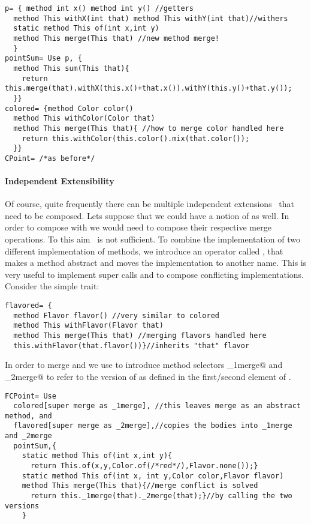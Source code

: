 \saveSpace\saveSpace \begin{lstlisting}
p= { method int x() method int y() //getters
  method This withX(int that) method This withY(int that)//withers
  static method This of(int x,int y)
  method This merge(This that) //new method merge!
  }
pointSum= Use p, { 
  method This sum(This that){
    return this.merge(that).withX(this.x()+that.x()).withY(this.y()+that.y());
  }}
colored= {method Color color()
  method This withColor(Color that)
  method This merge(This that){ //how to merge color handled here
    return this.withColor(this.color().mix(that.color());
  }}
CPoint= /*as before*/
\end{lstlisting} \saveSpace\saveSpace 

\paragraph{Independent Extensibility}
  Of course, quite frequently there can be multiple independent
  extensions~\cite{Zenger-Odersky2005} that need to be composed. Lets suppose that 
  we could have a notion of \Q@flavored@ as well.   
  In order to compose \Q@colored@ with \Q@flavored@ we would
  need to compose their respective merge operations. To this aim \use\ is not sufficient. To combine the implementation of two different implementation of methods, we introduce an operator called \Q@super@, that
 makes a method abstract and
moves the implementation to another name. This is very useful to implement super calls
 and to compose conflicting implementations.
\noindent Consider the simple \Q@flavored@ trait:
\saveSpace\saveSpace \begin{lstlisting}
flavored= {
  method Flavor flavor() //very similar to colored
  method This withFlavor(Flavor that)
  method This merge(This that) //merging flavors handled here
  this.withFlavor(that.flavor())}//inherits "that" flavor
\end{lstlisting}  \saveSpace\saveSpace

\noindent In order to merge \Q@colored@ and \Q@flavored@ we use  \Q@super@ to introduce method selectors \Q@_1merge@ and \Q@_2merge@
to refer to the version of \Q@merge@ as defined in the first/second element of \use.

\saveSpace\saveSpace \begin{lstlisting}
FCPoint= Use
  colored[super merge as _1merge], //this leaves merge as an abstract method, and
  flavored[super merge as _2merge],//copies the bodies into _1merge and _2merge
  pointSum,{
    static method This of(int x,int y){
      return This.of(x,y,Color.of(/*red*/),Flavor.none());}
    static method This of(int x, int y,Color color,Flavor flavor)
    method This merge(This that){//merge conflict is solved 
      return this._1merge(that)._2merge(that);}//by calling the two versions
    }
\end{lstlisting}  \saveSpace\saveSpace


